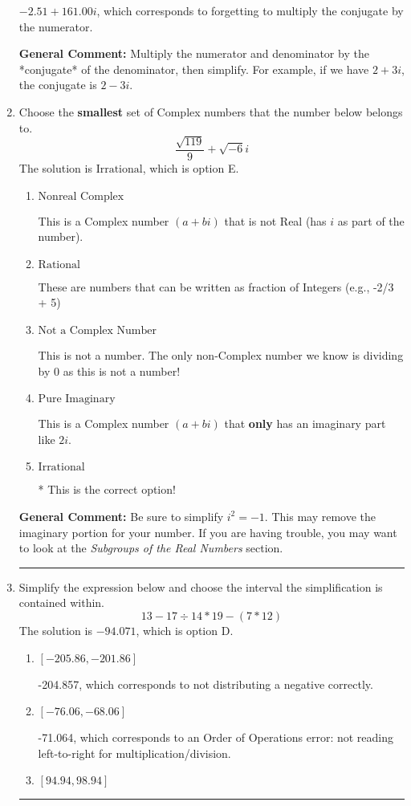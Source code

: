 \documentclass{extbook}[14pt]
\newcommand{\litem}[1]{\item #1

\rule{\textwidth}{0.4pt}}
\begin{document}
\begin{enumerate}
{\begin{enumerate}[label=\Alph*.]
 $-2.51  + 161.00 i$, which corresponds to forgetting to multiply the conjugate by the numerator.
\end{enumerate}

\textbf{General Comment:} Multiply the numerator and denominator by the *conjugate* of the denominator, then simplify. For example, if we have $2+3i$, the conjugate is $2-3i$.
}
\litem{
Choose the \textbf{smallest} set of Complex numbers that the number below belongs to.
\[ \frac{\sqrt{119}}{9}+\sqrt{-6}i \]The solution is \( \text{Irrational} \), which is option E.\begin{enumerate}[label=\Alph*.]
\item \( \text{Nonreal Complex} \)

This is a Complex number $(a+bi)$ that is not Real (has $i$ as part of the number).
\item \( \text{Rational} \)

These are numbers that can be written as fraction of Integers (e.g., -2/3 + 5)
\item \( \text{Not a Complex Number} \)

This is not a number. The only non-Complex number we know is dividing by 0 as this is not a number!
\item \( \text{Pure Imaginary} \)

This is a Complex number $(a+bi)$ that \textbf{only} has an imaginary part like $2i$.
\item \( \text{Irrational} \)

* This is the correct option!
\end{enumerate}

\textbf{General Comment:} Be sure to simplify $i^2 = -1$. This may remove the imaginary portion for your number. If you are having trouble, you may want to look at the \textit{Subgroups of the Real Numbers} section.
}
\litem{
Simplify the expression below and choose the interval the simplification is contained within.
\[ 13 - 17 \div 14 * 19 - (7 * 12) \]The solution is \( -94.071 \), which is option D.\begin{enumerate}[label=\Alph*.]
\item \( [-205.86, -201.86] \)

 -204.857, which corresponds to not distributing a negative correctly.
\item \( [-76.06, -68.06] \)

 -71.064, which corresponds to an Order of Operations error: not reading left-to-right for multiplication/division.
\item \( [94.94, 98.94] \)


\end{enumerate}}
\end{enumerate}
\end{document}
